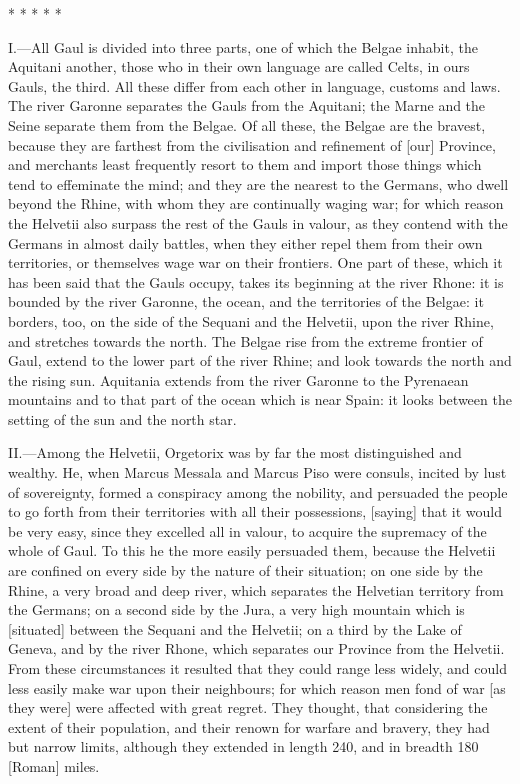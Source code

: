 * * * * *


I.—All Gaul is divided into three parts, one of which the Belgae
inhabit, the Aquitani another, those who in their own language are
called Celts, in ours Gauls, the third. All these differ from each other
in language, customs and laws. The river Garonne separates the Gauls
from the Aquitani; the Marne and the Seine separate them from the
Belgae. Of all these, the Belgae are the bravest, because they are
farthest from the civilisation and refinement of [our] Province, and
merchants least frequently resort to them and import those things which
tend to effeminate the mind; and they are the nearest to the Germans,
who dwell beyond the Rhine, with whom they are continually waging war;
for which reason the Helvetii also surpass the rest of the Gauls in
valour, as they contend with the Germans in almost daily battles, when
they either repel them from their own territories, or themselves wage
war on their frontiers. One part of these, which it has been said that
the Gauls occupy, takes its beginning at the river Rhone: it is bounded
by the river Garonne, the ocean, and the territories of the Belgae: it
borders, too, on the side of the Sequani and the Helvetii, upon the
river Rhine, and stretches towards the north. The Belgae rise from the
extreme frontier of Gaul, extend to the lower part of the river Rhine;
and look towards the north and the rising sun. Aquitania extends from
the river Garonne to the Pyrenaean mountains and to that part of the
ocean which is near Spain: it looks between the setting of the sun and
the north star.

II.—Among the Helvetii, Orgetorix was by far the most distinguished and
wealthy. He, when Marcus Messala and Marcus Piso were consuls, incited
by lust of sovereignty, formed a conspiracy among the nobility, and
persuaded the people to go forth from their territories with all their
possessions, [saying] that it would be very easy, since they excelled
all in valour, to acquire the supremacy of the whole of Gaul. To this he
the more easily persuaded them, because the Helvetii are confined on
every side by the nature of their situation; on one side by the Rhine, a
very broad and deep river, which separates the Helvetian territory from
the Germans; on a second side by the Jura, a very high mountain which is
[situated] between the Sequani and the Helvetii; on a third by the Lake
of Geneva, and by the river Rhone, which separates our Province from the
Helvetii. From these circumstances it resulted that they could range
less widely, and could less easily make war upon their neighbours; for
which reason men fond of war [as they were] were affected with great
regret. They thought, that considering the extent of their population,
and their renown for warfare and bravery, they had but narrow limits,
although they extended in length 240, and in breadth 180 [Roman] miles.

